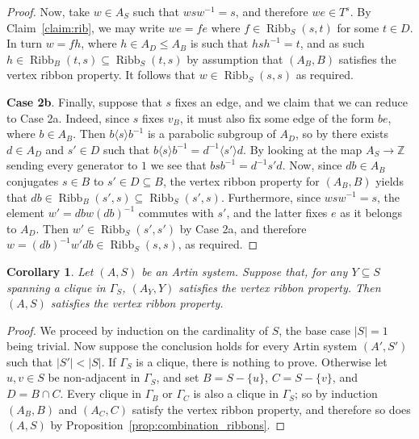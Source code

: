 \documentclass[svgnames]{amsart}
\theoremstyle{plain}
\newtheorem{cor}[thm]{Corollary}
\theoremstyle{definition}
\newcommand{\Z}{\mathbb{Z}}
\newcommand{\ribb}[3]{\operatorname{Ribb}_{#1}(#2,#3)}
\begin{document}
\begin{proof}
    Now, take $w \in A_S$ such that $wsw^{-1} = s$, and therefore $we \in T^s$. By Claim~\ref{claim:rib}, we may write $we = fe$ where $f \in \ribb{S}{s}{t}$ for some $t \in D$. In turn $w = fh$, where $h \in A_D\le A_B$ is such that $hsh^{-1} = t$, and as such $h \in \ribb{B}{t}{s}\subseteq \ribb{S}{t}{s}$ by assumption that $(A_B,B)$ satisfies the vertex ribbon property. It follows that $w \in \ribb{S}{s}{s}$ as required.
\par\medskip

    \textbf{Case 2b}. Finally, suppose that $s$ fixes an edge, and we claim that we can reduce to Case 2a. Indeed, since $s$ fixes $v_B$, it must also fix some edge of the form $be$, where $b\in A_B$. Then $b\langle s\rangle b^{-1}$ is a parabolic subgroup of $A_D$, so by \cite{blufstein2023parabolic} there exists $d\in A_D$ and $s'\in D$ such that $b\langle s\rangle b^{-1}=d^{-1}\langle s'\rangle d$. By looking at the map $A_S\to \Z$ sending every generator to $1$ we see that $bsb^{-1}=d^{-1}s'd$. Now, since $db\in A_B$ conjugates $s\in B$ to $s'\in D\subseteq B$, the vertex ribbon property for $(A_B,B)$ yields that $db\in \ribb{B}{s'}{s}\subseteq \ribb{S}{s'}{s}$. Furthermore, since $wsw^{-1}=s$, the element $w'=db w(db)^{-1}$ commutes with $s'$, and the latter fixes $e$ as it belongs to $A_D$. Then $w'\in \ribb{S}{s'}{s'}$ by Case 2a, and therefore $w=(db)^{-1} w'db\in \ribb{S}{s}{s}$, as required.
\end{proof}


\begin{cor}\label{cor:ribbon_for_cliques_ribbon_for_all}
    Let $(A,S)$ be an Artin system. Suppose that, for any $Y \subseteq S$ spanning a clique in $\Gamma_S$, $(A_Y,Y)$ satisfies the vertex ribbon property. Then $(A,S)$ satisfies the vertex ribbon property. 
\end{cor}

\begin{proof}
    We proceed by induction on the cardinality of $S$, the base case $|S|=1$ being trivial. Now suppose the conclusion holds for every Artin system $(A',S')$ such that $|S'|<|S|$. If $\Gamma_S$ is a clique, there is nothing to prove. Otherwise let $u,v\in S$ be non-adjacent in $\Gamma_S$, and set $B=S-\{u\}$, $C=S-\{v\}$, and $D=B\cap C$. Every clique in $\Gamma_B$ or $\Gamma_C$ is also a clique in $\Gamma_S$; so by induction $(A_B,B)$ and $(A_C,C)$ satisfy the vertex ribbon property, and therefore so does $(A,S)$ by Proposition~\ref{prop:combination_ribbons}.
\end{proof}
\end{document}
